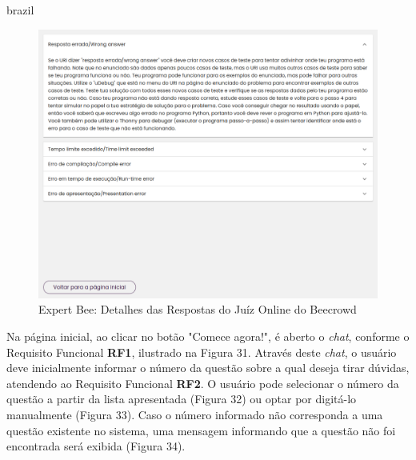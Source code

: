 \begin{otherlanguage*}{brazil}
\begin{figure}[H]
    \centering
            \caption{Expert Bee: Detalhes das Respostas do Juíz Online do Beecrowd}
            \label{fig:ModeloConceitual}
        \includegraphics[scale=0.41]{pictures/desenvolvimento/expert_bee_detalhes_respostas.png}
\end{figure}

Na página inicial, ao clicar no botão "Comece agora!", é aberto o \textit{chat}, conforme o Requisito Funcional \textbf{RF1}, ilustrado na Figura 31. Através deste \textit{chat}, o usuário deve inicialmente informar o número da questão sobre a qual deseja tirar dúvidas, atendendo ao Requisito Funcional \textbf{RF2}. O usuário pode selecionar o número da questão a partir da lista apresentada (Figura 32) ou optar por digitá-lo manualmente (Figura 33). Caso o número informado não corresponda a uma questão existente no sistema, uma mensagem informando que a questão não foi encontrada será exibida (Figura 34).


\end{otherlanguage*}
